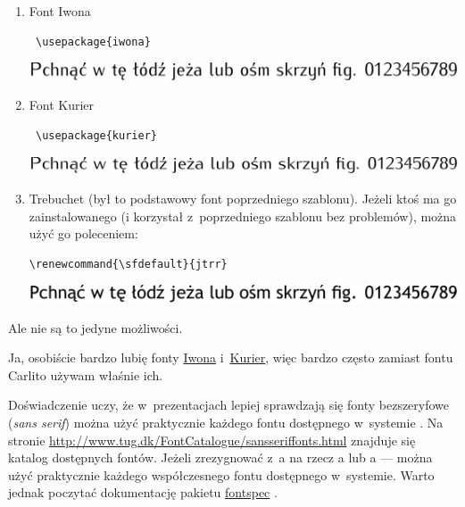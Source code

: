 \documentclass[12pt,aspectratio=169,ignorenonframetext]{beamer}
\begin{document}
\begin{frame}
\begin{enumerate}
  \item Font Iwona
        \begin{lstlisting}
 \usepackage{iwona}
\end{lstlisting}
        \includegraphics[width=.8\textwidth]{iwona}
  \item Font Kurier
        \begin{lstlisting}
 \usepackage{kurier}
\end{lstlisting}
        \includegraphics[width=.8\textwidth]{kurier}
  \item Trebuchet (był to podstawowy font poprzedniego szablonu).
        Jeżeli ktoś ma go zainstalowanego (i korzystał z~poprzedniego szablonu bez problemów), można użyć go poleceniem:
        \begin{lstlisting}
\renewcommand{\sfdefault}{jtrr}
\end{lstlisting}
        \includegraphics[width=.8\textwidth]{trebuchet}
 \end{enumerate}
 Ale nie są to jedyne możliwości.
\end{frame}

Ja, osobiście bardzo lubię fonty \href{https://www.ctan.org/pkg/iwona}{Iwona} i~\href{https://www.ctan.org/pkg/kurier}{Kurier}, więc bardzo często zamiast fontu Carlito używam właśnie ich.

Doświadczenie uczy, że w~prezentacjach lepiej sprawdzają się fonty bezszeryfowe (\emph{sans serif}) można użyć praktycznie każdego fontu dostępnego w~systemie . Na stronie \url{http://www.tug.dk/FontCatalogue/sansseriffonts.html} znajduje się katalog dostępnych fontów. Jeżeli zrezygnować z~a na rzecz a lub a — można użyć praktycznie każdego współczesnego fontu dostępnego w~systemie. Warto jednak poczytać dokumentację pakietu \href{https://ctan.org/pkg/fontspec}{fontspec} \cite{Fontspec}.
\end{document}
